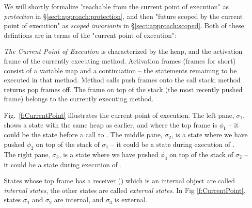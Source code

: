 \vspace{.2cm}
 
\noindent 

\noindent We will shortly formalize "reachable from the current point of execution" as
\emph{protection} in \S \ref{sect:approach:protection},
and then  "future scoped by the current point of execution"
as  \emph{scoped invariants} in \S \ref{sect:approach:scoped}.
Both of these defintions are in terms of the "current point of execution":

\noindent\emph{The Current Point of Execution}
is characterized by the heap, and   the activation frame of the currently executing method. 
Activation frames (frames for short) consist of a variable map and a continuation -- the statements remaining to be executed in that method.
Method calls push frames onto the call stack; method returns pop frames off.
The frame on top of the stack (the most recently pushed frame) 
belongs to the currently executing method.


Fig.\ \ref{f:CurrentPoint} illustrates the current point of execution.  The left pane, $\sigma_1$, shows a state with the same heap as earlier, and where the top frame is $\phi_1$ -- it could be the state before a call to .
  The middle pane, $\sigma_2$, is a state where we have pushed  $\phi_2$ on top of the stack of $\sigma_1$ -- it could be a state during execution of .
   The right pane, $\sigma_3$, is a state where we have pushed  $\phi_3$ on top of the stack of $\sigma_2$ -- it could be a state during execution of . 

States whose top frame has a  receiver () which is an internal object are called  \emph{internal states}, the other states are called  \emph{external states}. In Fig \ref{f:CurrentPoint}, states $\sigma_1$ and $\sigma_2$ are internal, and  $\sigma_3$ is external.




